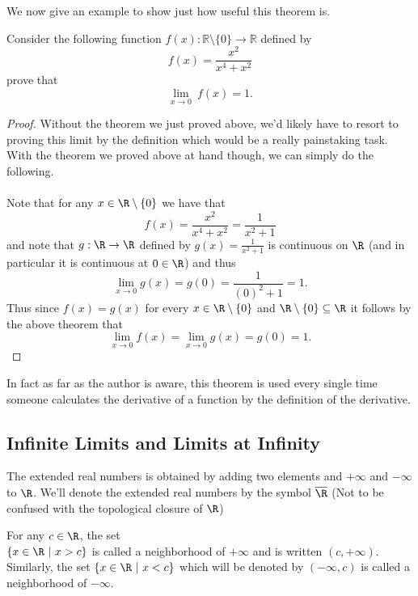 	  	We now give an example to show just how useful this theorem is.
	  	
	  	\begin{example}
	  		Consider the following function $f(x) : \mathbb{R} \setminus \{0\} \to \mathbb{R}$ defined by $$f(x) = \frac{x^2}{x^4 + x^2}$$ prove that $$\lim_{x \to 0} \ f(x) = 1.$$
	  	\end{example}
	  	
	  	\begin{proof}
	  		Without the theorem we just proved above, we'd likely have to resort to proving this limit by the definition which would be a really painstaking task. With the theorem we proved above at hand though, we can simply do the following.
	  		\\ \\
	  		Note that for any $x \in \R \setminus \{0\}$ we have that $$f(x) =\frac{x^2}{x^4 + x^2} = \frac{1}{x^2+1}$$ and note that $g : \R \to \R$ defined by $g(x) = \frac{1}{x^2+1}$ is continuous on $\R$ (and in particular it is continuous at $0 \in \R$) and thus $$\lim_{x \to 0} g(x) = g(0) = \frac{1}{(0)^2 + 1} = 1.$$ Thus since $f(x) = g(x)$ for every $x \in \R \setminus \{0\}$ and $\R \setminus \{0\} \subseteq \R$ it follows by the above theorem that  $$\lim_{x \to 0} f(x) = \lim_{x \to 0}g(x) = g(0) = 1.$$
	  	\end{proof}
	  	
	  	In fact as far as the author is aware, this theorem is used every single time someone calculates the derivative of a function by the definition of the derivative.
	  
	  \newpage
	 
	 \subsection{Infinite Limits and Limits at Infinity}
	 
	 
	 \begin{definition}
	 	The extended real numbers is obtained by adding two elements and $+\infty$ and $-\infty$ to $\R$. We'll denote the extended real numbers by the symbol $\overline{\R}$ (Not to be confused with the topological closure of $\R$)
	 \end{definition}
	 
	 
	 \begin{definition}
	 	For any $c \in \R$, the set\\ $\{x \in \R \ | \ x > c\}$ is called a neighborhood of $+\infty$ and is written $(c, +\infty)$. Similarly, the set $\{ x \in \R \ | \ x < c\}$ which will be denoted by $(-\infty, c)$ is called a neighborhood of $-\infty$.
	 \end{definition}
	 
